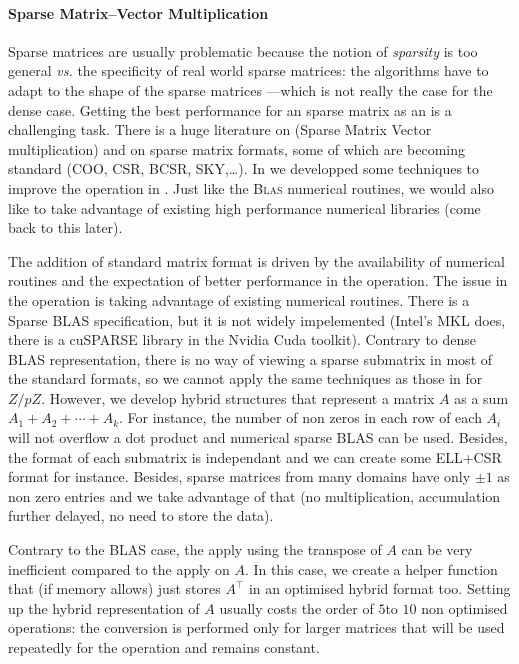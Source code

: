 \paragraph{Sparse Matrix--Vector Multiplication}
%
Sparse matrices are usually problematic because the notion of \emph{sparsity}
is too general \emph{vs.} the specificity of real world sparse matrices: the
algorithms have to adapt to the shape of the sparse matrices ---which is not really the case
for the dense case.
%
Getting the best performance for an sparse matrix as an \applin is a
challenging task. There is a huge literature on \spmv (Sparse Matrix Vector
multiplication) and on sparse matrix formats, some of which are becoming
standard (COO, CSR, BCSR, SKY,\ldots).  In \cite{Boyer:2010:spmv} we developped
some techniques to improve the \spmv operation in \linbox.
Just like the \textsc{Blas} numerical
routines, we would also like to take advantage of existing high performance
numerical libraries (come back to this later).
%
\par
%
The addition of standard matrix format is driven by the availability of
numerical routines and the expectation of better performance in the \spmv
operation.
The issue in the \spmv operation is taking advantage of existing numerical
routines. There is a Sparse BLAS specification, but it is not widely
impelemented (Intel's MKL does, there is a cuSPARSE library in the Nvidia Cuda
toolkit). Contrary to dense BLAS representation, there is no way of viewing a
sparse submatrix in most of the standard formats, so we cannot apply the same
techniques as those in \fflas for $Z/pZ$. However, we develop hybrid structures
that represent a matrix $A$ as a sum $A_1 + A_2 + \cdots + A_k$. For instance,
the number of non zeros in each row of each $A_i$ will not overflow a dot
product and numerical sparse BLAS can be used. Besides, the format of each
submatrix is independant and we can create some ELL+CSR format for instance.
Besides, sparse matrices  from many domains have only $\pm1$ as non zero
entries and we take advantage of that (no multiplication, accumulation further
delayed, no need to store the data).
%
\par
%
Contrary to the BLAS case, the apply using the transpose of $A$ can be very
inefficient compared to the apply on $A$. In this case, we create a helper
function that (if memory allows) just stores $A^\top$ in an optimised hybrid
format too. Setting up the hybrid representation of $A$ usually costs the order
of $5$to $10$ non optimised \spmv operations: the conversion is performed only
for larger matrices that will be used repeatedly for the \spmv operation and
remains constant.
